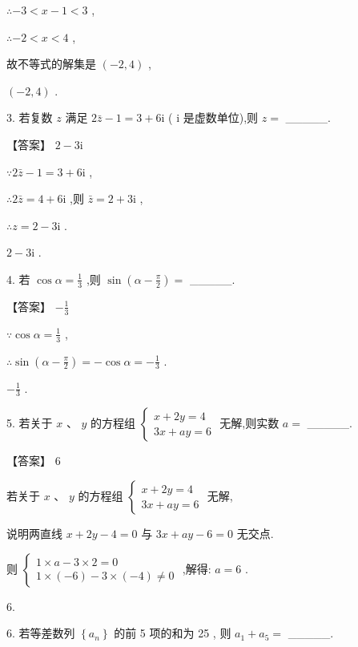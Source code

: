 \documentclass[10pt]{article}
\begin{document}
\(\therefore  - 3 < x - 1 < 3\) ,

\(\therefore  - 2 < x < 4\) ,

故不等式的解集是 \(\left( {-2,4}\right)\) ,

\(\left( {-2,4}\right)\) .

3. 若复数 \(z\) 满足 \(2\bar{z} - 1 = 3 + 6\mathrm{i}\) ( \(\mathrm{i}\) 是虚数单位),则 \(z =\) \_\_\_\_\_.

【答案】 \(2 - 3\mathrm{i}\)

\(\because 2\bar{z} - 1 = 3 + 6\mathrm{i}\) ,

\(\therefore 2\bar{z} = 4 + 6\mathrm{i}\) ,则 \(\bar{z} = 2 + 3\mathrm{i}\) ,

\(\therefore z = 2 - 3\mathrm{i}\) .

\(2 - 3\mathrm{i}\) .

4. 若 \(\cos \alpha  = \frac{1}{3}\) ,则 \(\sin \left( {\alpha  - \frac{\pi }{2}}\right)  =\) \_\_\_\_\_.

【答案】 \(- \frac{1}{3}\)

\(\because \cos \alpha  = \frac{1}{3}\) ,

\(\therefore \sin \left( {\alpha  - \frac{\pi }{2}}\right)  =  - \cos \alpha  =  - \frac{1}{3}\) .

\(- \frac{1}{3}\) .

5. 若关于 \(x\text{ 、 }y\) 的方程组 \(\left\{  \begin{array}{l} x + {2y} = 4 \\  {3x} + {ay} = 6 \end{array}\right.\) 无解,则实数 \(a =\) \_\_\_\_\_.

【答案】 6

若关于 \(x\text{ 、 }y\) 的方程组 \(\left\{  \begin{array}{l} x + {2y} = 4 \\  {3x} + {ay} = 6 \end{array}\right.\) 无解,

说明两直线 \(x + {2y} - 4 = 0\) 与 \({3x} + {ay} - 6 = 0\) 无交点.

则 \(\left\{  \begin{array}{l} 1 \times  a - 3 \times  2 = 0 \\  1 \times  \left( {-6}\right)  - 3 \times  \left( {-4}\right)  \neq  0 \end{array}\right.\) ,解得: \(a = 6\) .

6.

6. 若等差数列 \(\left\{  {a}_{n}\right\}\) 的前 5 项的和为 25 , 则 \({a}_{1} + {a}_{5} =\) \_\_\_\_\_.
\end{document}
